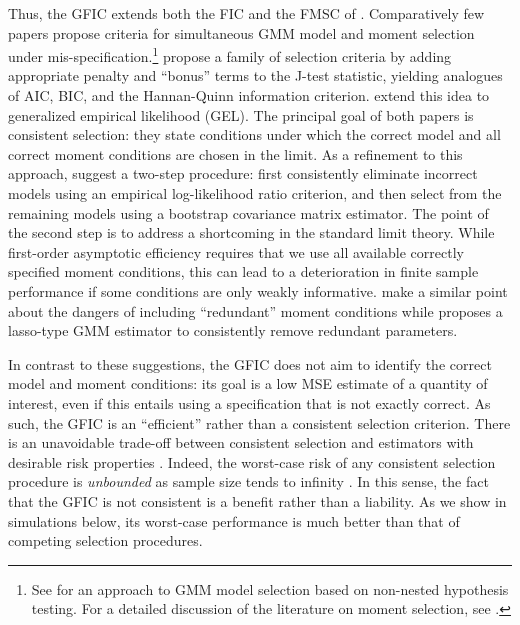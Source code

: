Thus, the GFIC extends both the FIC and the FMSC of \cite{DiTraglia2016}.
Comparatively few papers propose criteria for simultaneous GMM model and moment selection under mis-specification.\footnote{See \cite{Smith1992} for an approach to GMM model selection based on non-nested hypothesis testing. For a detailed discussion of the literature on moment selection, see \cite{DiTraglia2016}.} \cite{AndrewsLu} propose a family of selection criteria by adding appropriate penalty and ``bonus'' terms to the J-test statistic, yielding analogues of AIC, BIC, and the Hannan-Quinn information criterion.
\cite{HongPrestonShum} extend this idea to generalized empirical likelihood (GEL). 
The principal goal of both papers is consistent selection: they state conditions under which the correct model and all correct moment conditions are chosen in the limit. 
As a refinement to this approach, \cite{LaiSmallLiu} suggest a two-step procedure: first consistently eliminate incorrect models using an empirical log-likelihood ratio criterion, and then select from the remaining models using a bootstrap covariance matrix estimator. 
The point of the second step is to address a shortcoming in the standard limit theory. 
While first-order asymptotic efficiency requires that we use all available correctly specified moment conditions, this can lead to a deterioration in finite sample performance if some conditions are only weakly informative.
\cite{HallPeixe2003} make a similar point about the dangers of including ``redundant'' moment conditions while \cite{Caner2009} proposes a lasso-type GMM estimator to consistently remove redundant parameters.


In contrast to these suggestions, the GFIC does not aim to identify the correct model and moment conditions: its goal is a low MSE estimate of a quantity of interest, even if this entails using a specification that is not exactly correct.  
As such, the GFIC is an ``efficient'' rather than a consistent selection criterion.
There is an unavoidable trade-off between consistent selection and estimators with desirable risk properties \citep{Yang2005}.
Indeed, the worst-case risk of any consistent selection procedure is \emph{unbounded} as sample size tends to infinity \citep{LeebPoetscher2008}.
In this sense, the fact that the GFIC is not consistent is a benefit rather than a liability.
As we show in simulations below, its worst-case performance is much better than that of competing selection procedures.

